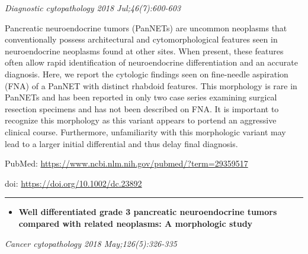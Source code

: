 \documentclass[]{article}
\providecommand{\tightlist}{%
  \setlength{\itemsep}{0pt}\setlength{\parskip}{0pt}}
\begin{document}
\emph{Diagnostic cytopathology 2018 Jul;46(7):600-603}

Pancreatic neuroendocrine tumors (PanNETs) are uncommon neoplasms that
conventionally possess architectural and cytomorphological features seen
in neuroendocrine neoplasms found at other sites. When present, these
features often allow rapid identification of neuroendocrine
differentiation and an accurate diagnosis. Here, we report the cytologic
findings seen on fine-needle aspiration (FNA) of a PanNET with distinct
rhabdoid features. This morphology is rare in PanNETs and has been
reported in only two case series examining surgical resection specimens
and has not been described on FNA. It is important to recognize this
morphology as this variant appears to portend an aggressive clinical
course. Furthermore, unfamiliarity with this morphologic variant may
lead to a larger initial differential and thus delay final diagnosis.

PubMed: \url{https://www.ncbi.nlm.nih.gov/pubmed/?term=29359517}

doi: \url{https://doi.org/10.1002/dc.23892}

{}

{}

\begin{center}\rule{0.5\linewidth}{\linethickness}\end{center}

\begin{itemize}
\tightlist
\item
  \textbf{Well differentiated grade 3 pancreatic neuroendocrine tumors
  compared with related neoplasms: A morphologic study}
\end{itemize}

\emph{Cancer cytopathology 2018 May;126(5):326-335}
\end{document}
